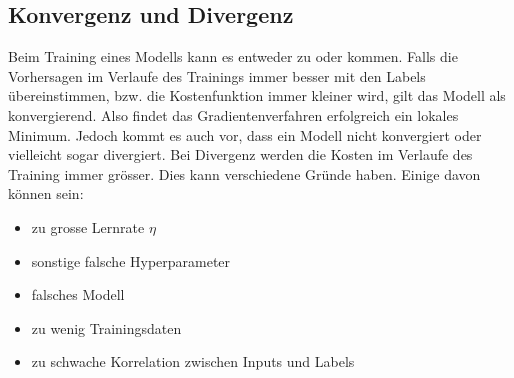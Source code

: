 \subsection{Konvergenz und Divergenz}\label{sec:konvergenz}
Beim Training eines Modells kann es entweder zu  oder  kommen.
Falls die Vorhersagen im Verlaufe des Trainings immer besser mit den Labels
übereinstimmen, bzw. die Kostenfunktion immer kleiner wird, gilt das Modell als konvergierend.
Also findet das Gradientenverfahren erfolgreich ein lokales Minimum.
\para{}
Jedoch kommt es auch vor, dass ein Modell nicht konvergiert oder vielleicht
sogar divergiert. Bei Divergenz werden die Kosten im Verlaufe des Training immer
grösser.
Dies kann verschiedene Gründe haben. Einige davon können sein:
\begin{itemize}
\item{zu grosse Lernrate $\eta$}
\item{sonstige falsche Hyperparameter}
\item{falsches Modell}
\item{zu wenig Trainingsdaten}
\item{zu schwache Korrelation zwischen Inputs und Labels}
\end{itemize}


